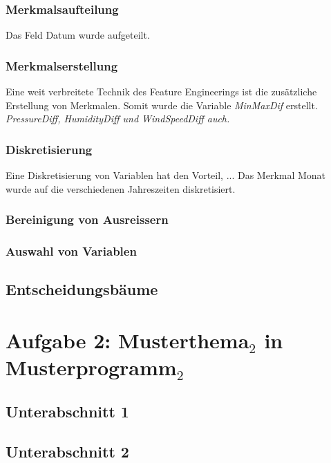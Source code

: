 \subsubsection{Merkmalsaufteilung}
Das Feld Datum wurde aufgeteilt.

\subsubsection{Merkmalserstellung}

Eine weit verbreitete Technik des Feature Engineerings ist die zusätzliche Erstellung von Merkmalen. Somit wurde die Variable \emph{MinMaxDif} erstellt. \emph{PressureDiff, HumidityDiff und WindSpeedDiff auch.}

\subsubsection{Diskretisierung}

Eine Diskretisierung von Variablen hat den Vorteil, ...
Das Merkmal Monat wurde auf die verschiedenen Jahreszeiten diskretisiert.

\subsubsection{Bereinigung von Ausreissern}

\subsubsection{Auswahl von Variablen}


\vspace{1cm}
\subsection{Entscheidungsbäume}
\pagebreak
\section{Aufgabe 2: Musterthema$_2$ in Musterprogramm$_2$}
\subsection{Unterabschnitt 1}
\vspace{1cm}
\subsection{Unterabschnitt 2}
